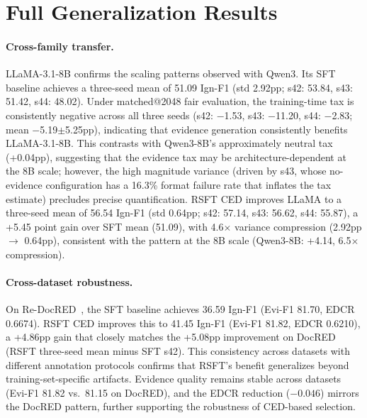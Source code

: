 \section{Full Generalization Results}
\label{sec:generalization_full}

\paragraph{Cross-family transfer.}
LLaMA-3.1-8B confirms the scaling patterns observed with Qwen3. Its SFT baseline achieves a three-seed mean of 51.09 Ign-F1 (std 2.92pp; s42: 53.84, s43: 51.42, s44: 48.02). Under matched@2048 fair evaluation, the training-time tax is consistently negative across all three seeds (s42: $-$1.53, s43: $-$11.20, s44: $-$2.83; mean $-$5.19$\pm$5.25pp), indicating that evidence generation consistently benefits LLaMA-3.1-8B. This contrasts with Qwen3-8B's approximately neutral tax (+0.04pp), suggesting that the evidence tax may be architecture-dependent at the 8B scale; however, the high magnitude variance (driven by s43, whose no-evidence configuration has a 16.3\% format failure rate that inflates the tax estimate) precludes precise quantification. RSFT CED improves LLaMA to a three-seed mean of 56.54 Ign-F1 (std 0.64pp; s42: 57.14, s43: 56.62, s44: 55.87), a +5.45 point gain over SFT mean (51.09), with 4.6$\times$ variance compression (2.92pp $\to$ 0.64pp), consistent with the pattern at the 8B scale (Qwen3-8B: +4.14, 6.5$\times$ compression).

\paragraph{Cross-dataset robustness.}
On Re-DocRED~\citep{tan2022redocred}, the SFT baseline achieves 36.59 Ign-F1 (Evi-F1 81.70, EDCR 0.6674). RSFT CED improves this to 41.45 Ign-F1 (Evi-F1 81.82, EDCR 0.6210), a +4.86pp gain that closely matches the +5.08pp improvement on DocRED (RSFT three-seed mean minus SFT s42). This consistency across datasets with different annotation protocols confirms that RSFT's benefit generalizes beyond training-set-specific artifacts. Evidence quality remains stable across datasets (Evi-F1 81.82 vs.\ 81.15 on DocRED), and the EDCR reduction ($-0.046$) mirrors the DocRED pattern, further supporting the robustness of CED-based selection.

